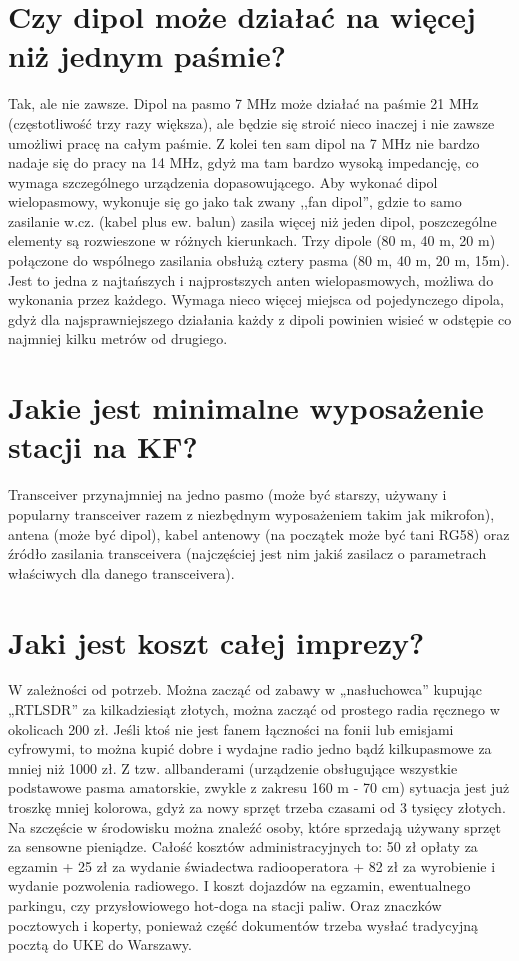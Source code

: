 \documentclass[a4paper,12pt]{article}
\begin{document}
\section{Czy dipol może działać na więcej niż jednym paśmie?}
Tak, ale nie zawsze. Dipol na pasmo 7 MHz może działać na paśmie 21 MHz (częstotliwość trzy razy większa), ale będzie się stroić nieco inaczej i nie zawsze umożliwi pracę na całym paśmie. Z kolei ten sam dipol na 7 MHz nie bardzo nadaje się do pracy na 14 MHz, gdyż ma tam bardzo wysoką impedancję, co wymaga szczególnego urządzenia dopasowującego. Aby wykonać dipol wielopasmowy, wykonuje się go jako tak zwany ,,fan dipol'', gdzie to samo zasilanie w.cz. (kabel plus ew. balun) zasila więcej niż jeden dipol, poszczególne elementy są rozwieszone w różnych kierunkach. Trzy dipole (80 m, 40 m, 20 m) połączone do wspólnego zasilania obsłużą cztery pasma (80 m, 40 m, 20 m, 15m). Jest to jedna z najtańszych i najprostszych anten wielopasmowych, możliwa do wykonania przez każdego. Wymaga nieco więcej miejsca od pojedynczego dipola, gdyż dla najsprawniejszego działania każdy z dipoli powinien wisieć w odstępie co najmniej kilku metrów od drugiego.

\section{Jakie jest minimalne wyposażenie stacji na KF?}
Transceiver przynajmniej na jedno pasmo (może być starszy, używany i popularny transceiver razem z niezbędnym wyposażeniem takim jak mikrofon), antena (może być dipol), kabel antenowy (na początek może być tani RG58) oraz źródło zasilania transceivera (najczęściej jest nim jakiś zasilacz o parametrach właściwych dla danego transceivera).

\section{Jaki jest koszt całej imprezy?}
W zależności od potrzeb. Można zacząć od zabawy w „nasłuchowca” kupując „RTLSDR” za kilkadziesiąt złotych, można zacząć od prostego radia ręcznego w okolicach 200 zł. Jeśli ktoś nie jest fanem łączności na fonii lub emisjami cyfrowymi, to można kupić dobre i wydajne radio jedno bądź kilkupasmowe za mniej niż 1000 zł. Z tzw. allbanderami (urządzenie obsługujące wszystkie podstawowe pasma amatorskie, zwykle z zakresu 160 m - 70 cm) sytuacja jest już troszkę mniej kolorowa, gdyż za nowy sprzęt trzeba czasami od 3 tysięcy złotych. Na szczęście w środowisku można znaleźć osoby, które sprzedają używany sprzęt za sensowne pieniądze.
Całość kosztów administracyjnych to: 50 zł opłaty za egzamin + 25 zł za wydanie świadectwa radiooperatora + 82 zł za wyrobienie i wydanie pozwolenia radiowego. I koszt dojazdów na egzamin, ewentualnego parkingu, czy przysłowiowego hot-doga na stacji paliw. Oraz znaczków pocztowych i koperty, ponieważ część dokumentów trzeba wysłać tradycyjną pocztą do UKE do Warszawy.
\end{document}
